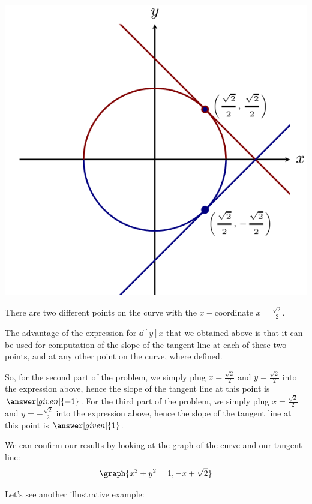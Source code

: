 \documentclass{ximera}
\begin{document}
\begin{example}
\begin{explanation}
\begin{image}
   \includegraphics{2.png}
\end{image}
    There are two different points on the curve with  the $x-$coordinate $x=\frac{\sqrt{2}}{2}$.
     
    The advantage of the expression for $\dd[y]{x} $ that we obtained above is that it can be used for computation of the slope of the tangent line at each of these two points, and at any other point on the curve, where defined.
  
 
So, for the second part of the problem, we simply plug $x=\frac{\sqrt{2}}{2}$ and $y=\frac{\sqrt{2}}{2}$
into the expression above, hence the slope of the tangent line at this point 
is $\answer[given]{-1}$.
For the third part of the problem, we simply plug $x=\frac{\sqrt{2}}{2}$ and $y=-\frac{\sqrt{2}}{2}$
into the expression above, hence the slope of the tangent line at this point 
is $\answer[given]{1}$.


\begin{onlineOnly}
  We can confirm our results by looking at the graph of the curve and
  our tangent line:
  \[
  \graph{x^2+y^2=1,-x+\sqrt{2}}
  \]
\end{onlineOnly}
\end{explanation}
\end{example}

Let's see another illustrative example:
\end{document}
